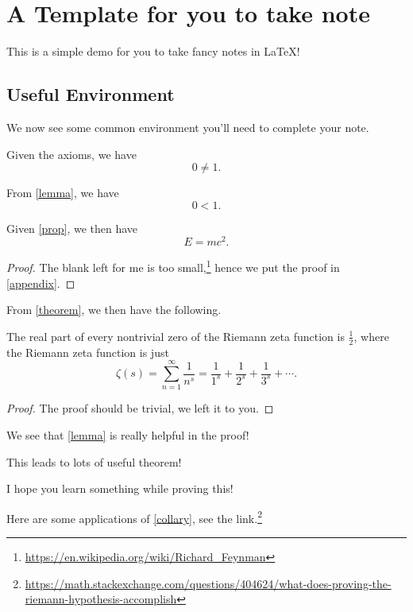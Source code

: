 \section{A Template for you to take note}
This is a simple demo for you to take fancy notes in \LaTeX!

\subsection{Useful Environment}
We now see some common environment you'll need to complete your note.

\begin{lemma}\label{lemma}
	Given the axioms, we have
	\[
		0\neq 1.
	\]
\end{lemma}

\begin{proposition}\label{prop}
	From \autoref{lemma}, we have
	\[
		0<1.
	\]
\end{proposition}

\begin{theorem}\label{theorem}
	Given \autoref{prop}, we then have
	\[
		E = mc^2.
	\]
\end{theorem}
\begin{proof}
	The blank left for me is too small,\footnote{\url{https://en.wikipedia.org/wiki/Richard_Feynman}} hence we put the proof in \autoref{appendix}.
\end{proof}

\begin{corollary}\label{collary}
	From \autoref{theorem}, we then have the following.

	\par The real part of every nontrivial zero of the Riemann zeta function is \(\frac{1}{2}\), where the
	Riemann zeta function is just
	\[
		\zeta (s)=\sum _{n=1}^{\infty }{\frac {1}{n^{s}}}={\frac {1}{1^{s}}}+{\frac {1}{2^{s}}}+{\frac {1}{3^{s}}}+\cdots.
	\]
\end{corollary}
\begin{proof}
	The proof should be trivial, we left it to you.
\end{proof}
\begin{prev}
	We see that \autoref{lemma} is really helpful in the proof!
\end{prev}
\begin{remark}
	This leads to lots of useful theorem!
\end{remark}
\begin{note}
	I hope you learn something while proving this!
\end{note}
\begin{eg}
	Here are some applications of \autoref{collary}, see the link.\footnote{\url{https://math.stackexchange.com/questions/404624/what-does-proving-the-riemann-hypothesis-accomplish}}
\end{eg}

